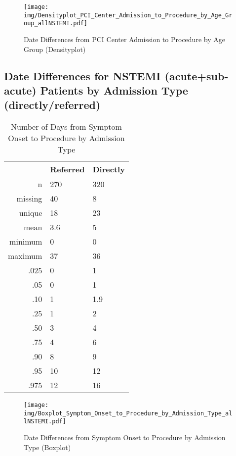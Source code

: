 \documentclass[a4paper]{report}
\begin{document}
\begin{itemize}
{\begin{figure}
  \centering
  \caption{Date Differences from PCI Center Admission to Procedure by Age Group (Densityplot)}
  \label{Density: Date Differences from PCI Center Admission to Procedure by Age Group}
\texttt{[image: img/Densityplot\_PCI\_Center\_Admission\_to\_Procedure\_by\_Age\_Group\_allNSTEMI.pdf]}\end{figure}





\clearpage
\subsection{Date Differences for NSTEMI (acute+sub-acute) Patients by Admission Type (directly/referred)}

\begin{table}[ht]
\centering
\begin{tabular}{rll}
  \toprule
 & Referred & Directly \\ 
  \midrule
n & 270 & 320 \\ 
  missing & 40 & 8 \\ 
  unique & 18 & 23 \\ 
  mean & 3.6 & 5 \\ 
  minimum & 0 & 0 \\ 
  maximum & 37 & 36 \\ 
  .025 & 0 & 1 \\ 
  .05 & 0 & 1 \\ 
  .10 & 1 & 1.9 \\ 
  .25 & 1 & 2 \\ 
  .50 & 3 & 4 \\ 
  .75 & 4 & 6 \\ 
  .90 & 8 & 9 \\ 
  .95 & 10 & 12 \\ 
  .975 & 12 & 16 \\ 
   \bottomrule
\end{tabular}
\caption{Number of Days from Symptom Onset to Procedure by Admission Type} 
\end{table}
\begin{figure}
  \centering
  \caption{Date Differences from Symptom Onset to Procedure by Admission Type (Boxplot)}
  \label{Boxplot: Date Differences from Symptom Onset to Procedure by Admission Type}
\texttt{[image: img/Boxplot\_Symptom\_Onset\_to\_Procedure\_by\_Admission\_Type\_allNSTEMI.pdf]}\end{figure}


}
\end{itemize}
\end{document}
